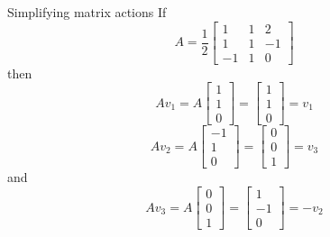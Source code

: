 \documentclass{beamer}
\begin{document}
\begin{frame}{Simplifying matrix actions}
	If
	\begin{equation*}
	A = \frac{1}{2}\left[
	\begin{matrix}
	1&1&2\\
	1&1&-1\\
	-1&1&0
	\end{matrix}
	\right]
	\end{equation*}
	then
	\begin{equation*}
		Av_1 = 
		A \left[
		\begin{matrix}
		1\\
		1\\
		0
		\end{matrix}
		\right] = 
		\left[
		\begin{matrix}
		1\\
		1\\
		0
		\end{matrix}
		\right] = v_1
	\end{equation*}
	\begin{equation*}
		Av_2 =
		A \left[
		\begin{matrix}
		-1\\
		1\\
		0
		\end{matrix}
		\right] = \left[
		\begin{matrix}
		0\\
		0\\
		1
		\end{matrix}
		\right] = v_3
	\end{equation*}
	and
	\begin{equation*}
		Av_3 =
		A \left[
		\begin{matrix}
		0\\
		0\\
		1
		\end{matrix}
		\right] =
		\left[
		\begin{matrix}
		1\\
		-1\\
		0
		\end{matrix}
		\right] = -v_2
	\end{equation*}
\end{frame}
\end{document}
